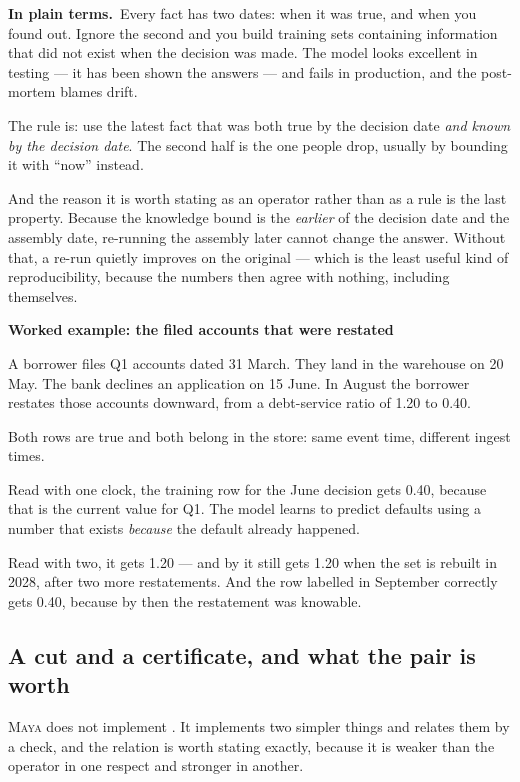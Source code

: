 \documentclass[11pt,a4paper]{article}
\renewcommand{\_}{\oldunderscore\allowbreak}
\theoremstyle{plain}
\theoremstyle{definition}
\theoremstyle{definition}
\theoremstyle{remark}
\newcommand{\pt}{\textbf{In plain terms.}\ }
\newcommand{\wk}[1]{\textbf{Worked example: #1}\par\smallskip}
\begin{document}
\begin{plain}
\pt Every fact has two dates: when it was true, and when you found out. Ignore the second and you build
training sets containing information that did not exist when the decision was made. The model looks
excellent in testing --- it has been shown the answers --- and fails in production, and the post-mortem
blames drift.

The rule is: use the latest fact that was both true by the decision date \emph{and known by the decision
date}. The second half is the one people drop, usually by bounding it with ``now'' instead.

And the reason it is worth stating as an operator rather than as a rule is the last property. Because the
knowledge bound is the \emph{earlier} of the decision date and the assembly date, re-running the assembly
later cannot change the answer. Without that, a re-run quietly improves on the original --- which is the
least useful kind of reproducibility, because the numbers then agree with nothing, including themselves.
\end{plain}

\begin{worked}
\wk{the filed accounts that were restated}
A borrower files Q1 accounts dated 31 March. They land in the warehouse on 20 May. The bank declines an
application on 15 June. In August the borrower restates those accounts downward, from a debt-service
ratio of 1.20 to 0.40.

Both rows are true and both belong in the store: same event time, different ingest times.

Read with one clock, the training row for the June decision gets 0.40, because that is the current value
for Q1. The model learns to predict defaults using a number that exists \emph{because} the default
already happened.

Read with two, it gets 1.20 --- and by  it still gets 1.20 when the set is rebuilt in
2028, after two more restatements. And the row labelled in September correctly gets 0.40, because by then
the restatement was knowable.
\end{worked}

\subsection{A cut and a certificate, and what the pair is worth}\label{sec:cutcert}

\textsc{Maya} does not implement . It implements two simpler things and relates them by a
check, and the relation is worth stating exactly, because it is weaker than the operator in one respect
and stronger in another.
\end{document}
